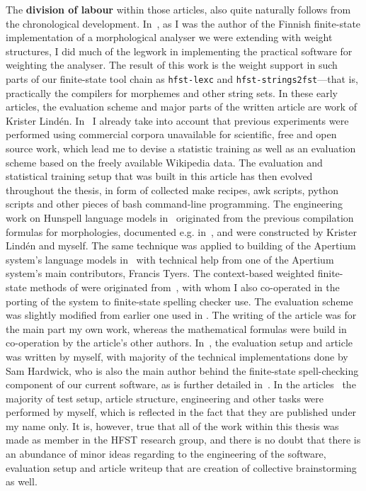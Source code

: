 \documentclass[officiallayout]{unihelcompling}
\begin{document}
The \textbf{division of labour} within those articles, also quite naturally
follows from the chronological development.
In~, as I was the author
of the Finnish finite-state implementation of a morphological analyser we were
extending with weight structures, I did much of the legwork in implementing the
practical software for weighting the analyser. The result of this work is the
weight support in such parts of our finite-state tool chain as
\texttt{hfst-lexc} and \texttt{hfst-strings2fst}---that is, practically the
compilers for morphemes and other string sets. In these early articles, the
evaluation scheme and major parts of the written article are work of Krister
Lindén.  In~ I already take into account
that previous experiments were performed using commercial corpora unavailable
for scientific, free and open source work, which lead me to devise a statistic
training as well as an evaluation scheme based on the freely available
Wikipedia data. The evaluation and statistical training setup that was built in
this article has then evolved throughout the thesis, in form of collected make
recipes, awk scripts, python scripts and other pieces of bash command-line
programming. The engineering work on Hunspell language models
in~ originated from the
previous compilation formulas for morphologies, documented e.g.\/
in~\cite{linden2009hfst}, and were constructed by Krister Lindén and myself.
The same technique was applied to building of the Apertium system's language
models in~ with technical help from one of the
Apertium system's main contributors, Francis Tyers.  The context-based weighted
finite-state methods of  were originated
from~\citet{silfverberg2010partofspeech}, with whom I also co-operated in the
porting of the system to finite-state spelling checker use. The evaluation
scheme was slightly modified from earlier one used in
. The writing of the article
 was for the main part  my own work, whereas
the mathematical formulas were build in co-operation by the article's other
authors.  In~, the evaluation setup and article
was written by myself, with majority of the technical implementations done by
Sam Hardwick, who is also the main author behind the finite-state
spell-checking component of our current software, as is further detailed
in~\citet{linden2011hfst}.  In the
articles~ the majority
of test setup, article structure, engineering and other tasks were performed by
myself, which is reflected in the fact that they are published under my name
only. It is, however, true that all of the work within this thesis was made as
member in the HFST research group, and there is no doubt that there is an
abundance of minor ideas regarding to the engineering of the software,
evaluation setup and article writeup that are creation of collective
brainstorming as well.
\end{document}
